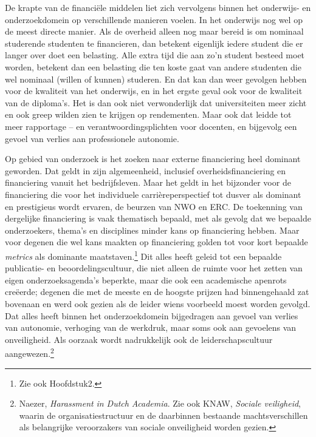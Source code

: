 \documentclass[smallauthor, chapterhaspagenum, nochapterinheader, pagenuminheader,  bigchapnum,medium2, tocpages, garamond, titleinheader]{jote-book}
\begin{document}
	De krapte van de financiële middelen liet zich vervolgens binnen het onderwijs- en onderzoekdomein op verschillende manieren voelen. In het onderwijs nog wel op de meest directe manier. Als de overheid alleen nog maar bereid is om nominaal studerende studenten te financieren, dan betekent eigenlijk iedere student die er langer over doet een belasting. Alle extra tijd die aan zo'n student besteed moet worden, betekent dan een belasting die ten koste gaat van andere studenten die wel nominaal (willen of kunnen) studeren. En dat kan dan weer gevolgen hebben voor de kwaliteit van het onderwijs, en in het ergste geval ook voor de kwaliteit van de diploma's. Het is dan ook niet verwonderlijk dat universiteiten meer zicht en ook greep wilden zien te krijgen op rendementen. Maar ook dat leidde tot meer rapportage -- en verantwoordingsplichten voor docenten, en bijgevolg een gevoel van verlies aan professionele autonomie.



	Op gebied van onderzoek is het zoeken naar externe financiering heel dominant geworden. Dat geldt in zijn algemeenheid, inclusief overheidsfinanciering en financiering vanuit het bedrijfsleven. Maar het geldt in het bijzonder voor de financiering die voor het individuele carrièreperspectief tot dusver als dominant en prestigieus wordt ervaren, de beurzen van NWO en ERC. De toekenning van dergelijke financiering is vaak thematisch bepaald, met als gevolg dat we bepaalde onderzoekers, thema's en disciplines minder kans op financiering hebben. Maar voor degenen die wel kans maakten op financiering golden tot voor kort bepaalde \emph{metrics} als dominante maatstaven.\footnote{Zie ook Hoofdstuk2. } Dit alles heeft geleid tot een bepaalde publicatie- en beoordelingscultuur, die niet alleen de ruimte voor het zetten van eigen onderzoeksagenda's beperkte, maar die ook een academische apenrots creëerde; degenen die met de meeste en de hoogste prijzen had binnengehaald zat bovenaan en werd ook gezien als de leider wiens voorbeeld moest worden gevolgd. Dat alles heeft binnen het onderzoekdomein bijgedragen aan gevoel van verlies van autonomie, verhoging van de werkdruk, maar soms ook aan gevoelens van onveiligheid. Als oorzaak wordt nadrukkelijk ook de leiderschapscultuur aangewezen.\footnote{Naezer, \emph{Harassment}\emph{ in Dutch }\emph{Academia}. Zie ook KNAW, \emph{Sociale veiligheid}, waarin de organisatiestructuur en de daarbinnen bestaande machtsverschillen als belangrijke veroorzakers van sociale onveiligheid worden gezien.}
\end{document}
